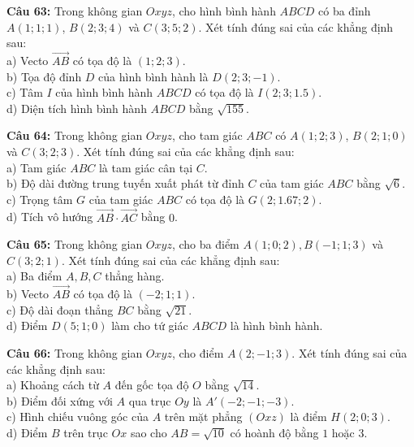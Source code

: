 \documentclass[12pt]{article}
\begin{document}
	\vspace{4mm}
	\noindent \textbf{Câu 63:} Trong không gian $Oxyz$, cho hình bình hành $ABCD$ có ba đỉnh $A(1; 1; 1)$, $B(2; 3; 4)$ và $C(3; 5; 2)$. Xét tính đúng sai của các khẳng định sau: \\
	\noindent a) Vecto $\vec{AB}$ có tọa độ là $(1; 2; 3)$. \\
	\noindent b) Tọa độ đỉnh $D$ của hình bình hành là $D(2; 3; -1)$. \\
	\noindent c) Tâm $I$ của hình bình hành $ABCD$ có tọa độ là $I(2; 3; 1.5)$. \\
	\noindent d) Diện tích hình bình hành $ABCD$ bằng $\sqrt{155}$.
	
	\vspace{4mm}
	\noindent \textbf{Câu 64:} Trong không gian $Oxyz$, cho tam giác $ABC$ có $A(1; 2; 3)$, $B(2; 1; 0)$ và $C(3; 2; 3)$. Xét tính đúng sai của các khẳng định sau: \\
	\noindent a) Tam giác $ABC$ là tam giác cân tại $C$. \\
	\noindent b) Độ dài đường trung tuyến xuất phát từ đỉnh $C$ của tam giác $ABC$ bằng $\sqrt{6}$. \\
	\noindent c) Trọng tâm $G$ của tam giác $ABC$ có tọa độ là $G(2; 1.67; 2)$. \\
	\noindent d) Tích vô hướng $\vec{AB} \cdot \vec{AC}$ bằng $0$.
	
	\vspace{4mm}
	\noindent \textbf{Câu 65:} Trong không gian $Oxyz$, cho ba điểm $A(1; 0; 2), B(-1; 1; 3)$ và $C(3; 2; 1)$. Xét tính đúng sai của các khẳng định sau: \\
	\noindent a) Ba điểm $A, B, C$ thẳng hàng. \\
	\noindent b) Vecto $\vec{AB}$ có tọa độ là $(-2; 1; 1)$. \\
	\noindent c) Độ dài đoạn thẳng $BC$ bằng $\sqrt{21}$. \\
	\noindent d) Điểm $D(5; 1; 0)$ làm cho tứ giác $ABCD$ là hình bình hành.
	
	\vspace{4mm}
	\noindent \textbf{Câu 66:} Trong không gian $Oxyz$, cho điểm $A(2; -1; 3)$. Xét tính đúng sai của các khẳng định sau: \\
	\noindent a) Khoảng cách từ $A$ đến gốc tọa độ $O$ bằng $\sqrt{14}$. \\
	\noindent b) Điểm đối xứng với $A$ qua trục $Oy$ là $A'(-2; -1; -3)$. \\
	\noindent c) Hình chiếu vuông góc của $A$ trên mặt phẳng $(Oxz)$ là điểm $H(2; 0; 3)$. \\
	\noindent d) Điểm $B$ trên trục $Ox$ sao cho $AB = \sqrt{10}$ có hoành độ bằng $1$ hoặc $3$.
	
\end{document}
